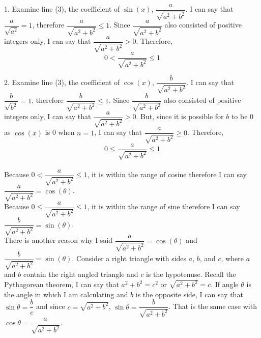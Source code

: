 \documentclass[12pt]{book}
\begin{document}
\begin{enumerate}
1. Examine line (3), the coefficient of $\sin(x)$, $\dfrac{a}{\sqrt{a^2+b^2}}$. I can say that 
$\dfrac{a}{\sqrt{a^2}} = 1$, therefore $\dfrac{a}{\sqrt{a^2+b^2}} \leq 1$. Since $\dfrac{a}{\sqrt{a^2+b^2}}$ also consisted of positive integers only, I can say that $\dfrac{a}{\sqrt{a^2+b^2}} > 0$. Therefore, $$0 < \dfrac{a}{\sqrt{a^2+b^2}} \leq 1$$

2. Examine line (3), the coefficient of $\cos(x)$, $\dfrac{b}{\sqrt{a^2+b^2}}$. I can say that 
$\dfrac{b}{\sqrt{b^2}} = 1$, therefore $\dfrac{b}{\sqrt{a^2+b^2}} \leq 1$. Since $\dfrac{b}{\sqrt{a^2+b^2}}$ also consisted of positive integers only, I can say that $\dfrac{a}{\sqrt{a^2+b^2}} > 0$. But, since it is possible for $b$ to be 0 as $\cos(x)$ is 0 when $n = 1$, I can say that $\dfrac{a}{\sqrt{a^2+b^2}} \geq 0$. Therefore, $$0 \leq \dfrac{a}{\sqrt{a^2+b^2}} \leq 1$$\\

Because $0 < \dfrac{a}{\sqrt{a^2+b^2}} \leq 1$, it is within the range of cosine therefore I can say $\dfrac{a}{\sqrt{a^2+b^2}} = \cos(\theta)$.\\

Because $0 \leq \dfrac{a}{\sqrt{a^2+b^2}} \leq 1$, it is within the range of sine therefore I can say $\dfrac{b}{\sqrt{a^2+b^2}} = \sin(\theta)$.\\

There is another reason why I said $\dfrac{a}{\sqrt{a^2+b^2}} = \cos(\theta)$ and $\dfrac{b}{\sqrt{a^2+b^2}} = \sin(\theta)$. Consider a right triangle with sides $a$, $b$, and $c$, where $a$ and $b$ contain the right angled triangle and $c$ is the hypotenuse. Recall the Pythagorean theorem, I can say that $a^2 + b^2 = c^2$ or $\sqrt{a^2 + b^2} = c$. If angle $\theta$ is the angle in which I am calculating and $b$ is the opposite side, I can say that $\sin \theta = \dfrac{b}{c}$ and since $c = \sqrt{a^2 + b^2}$, $\sin \theta = \dfrac{b}{\sqrt{a^2+b^2}}$. That is the same case with $\cos \theta = \dfrac{a}{\sqrt{a^2+b^2}}$.


\end{enumerate}
\end{document}
